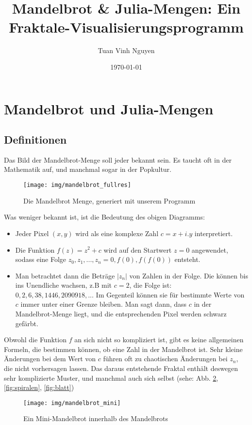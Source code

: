 \documentclass{article}
\title{Mandelbrot \& Julia-Mengen: Ein Fraktale-Visualisierungsprogramm} %
\author{Tuan Vinh Nguyen} %
\date{\today} %
\begin{document}
		\maketitle %
		
\section{Mandelbrot und Julia-Mengen}
\subsection{Definitionen}
Das Bild der Mandelbrot-Menge soll jeder bekannt sein. Es taucht oft in der Mathematik auf, und manchmal sogar in der Popkultur.
\begin{figure}[!htb]
\centering
\texttt{[image: img/mandelbrot\_fullres]}
\caption{Die Mandelbrot Menge, generiert mit unserem Programm}
\label{fig:mandelbrotfullres}
\end{figure}
Was weniger bekannt ist, ist die Bedeutung des obigen Diagramms: 
\begin{itemize}
\item Jeder Pixel $(x,y)$ wird als eine komplexe Zahl $c = x + i.y$ interpretiert.
\item Die Funktion $f(z) = z^2 +c$ wird auf den Startwert $z=0$ angewendet, sodass eine Folge $z_0, z_1, ..., z_n = 0, f(0), f(f(0))$ entsteht.
\item Man betrachtet dann die Beträge $|z_n|$ von Zahlen in der Folge. Die können bis ins Unendliche wachsen, z.B mit $c=2$, die Folge ist: $0,2,6,38,1446,2090918, ...$ Im Gegenteil können sie für bestimmte Werte von $c$ immer unter einer Grenze bleiben. Man sagt dann, dass $c$ in der Mandelbrot-Menge liegt, und die entsprechenden Pixel werden schwarz gefärbt. \cite{wiki-mandelbrot}
\end{itemize}
Obwohl die Funktion $f$ an sich nicht so kompliziert ist, gibt es keine allgemeinen Formeln, die bestimmen können, ob eine Zahl in der Mandelbrot ist. Sehr kleine Änderungen bei dem Wert von $c$ führen oft zu chaotischen Änderungen bei $z_n$, die nicht vorhersagen lassen. Das daraus entstehende Fraktal enthält deswegen sehr komplizierte Muster, und manchmal auch sich selbst (sehe: Abb. \ref{fig:mandelbrotmini}, \ref{fig:spiralen}, \ref{fig:blatt})

\begin{figure}
\centering
\texttt{[image: img/mandelbrot\_mini]}
\caption{Ein Mini-Mandelbrot innerhalb des Mandelbrots}
\label{fig:mandelbrotmini}
\end{figure}
\end{document}
